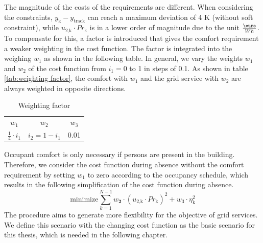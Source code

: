 The magnitude of the costs of the requirements are different. When considering the constraints, $y_\text{k}-y_\text{track}$ can reach a maximum deviation of 4 K (without soft constraint), while $u_\text{2,k}\cdot Pr_\text{k}$ is in a lower order of magnitude due to the unit $\frac{\text{\euro}}{Wh}$. To compensate for this, a factor is introduced that gives the comfort requirement a weaker weighting in the cost function. The factor is integrated into the weighing $w_\text{1}$ as shown in the following table. In general, we vary the weights $w_\text{1}$ and $w_\text{2}$ of the cost function from $ i_{1}= 0$ to 1 in steps of 0.1. As shown in table \autoref{tab:weighting factor}, the comfort with $w_\text{1}$ and the grid service with $w_\text{2}$ are always weighted in opposite directions.\newline
\begin{table}[h]
    \centering
    \begin{tabular}{c|c|c}
         $w_\text{1}$ & $w_\text{2}$ & $w_\text{3}$ \\
        $\frac{1}{4} \cdot i_\text{1}$ & $i_\text{2}=1-i_\text{1}$ & 0.01
    \end{tabular}
    \caption{Weighting factor}
    \label{tab:weighting factor}
\end{table}
Occupant comfort is only necessary if persons are present in the building. Therefore, we consider the cost function during absence without the comfort requirement by setting $w_\text{1}$ to zero according to the occupancy schedule, which results in the following simplification of the cost function during absence.
    \begin{equation}
        \text{minimize} \sum_{k=1}^{N-1} w_\textbf{2}\cdot(u_\text{2,k}\cdot Pr_\text{k})^2 + w_\text{3} \cdot \eta_\text{k}^2
        \label{eq:costfunctionAbwesenheit}
    \end{equation}
The procedure aims to generate more flexibility for the objective of grid services. We define this scenario with the changing cost function as the basic scenario for this thesis, which is needed in the following chapter. 

